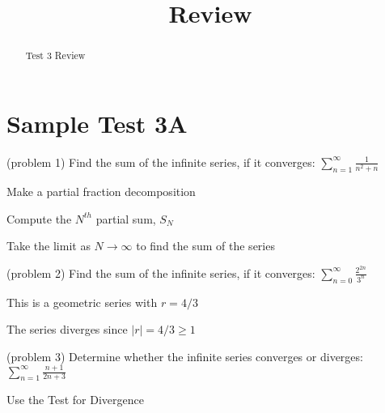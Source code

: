 \documentclass[handout]{ximera}
\title{Review}
\begin{document}
\begin{abstract}
Test 3 Review
\end{abstract}

\maketitle

\section{Sample Test 3A}





\begin{problem}(problem 1)
Find the sum of the infinite series, if it converges: $\displaystyle\sum_{n=1}^\infty \frac{1}{n^2 +n}$

\begin{hint}
Make a partial fraction decomposition
\end{hint}

\begin{hint}
Compute the $N^{th}$ partial sum, $S_N$
\end{hint}

\begin{hint}
Take the limit as $N \to \infty$ to find the sum of the series
\end{hint}

\end{problem}


\begin{problem}(problem 2)
Find the sum of the infinite series, if it converges: $\displaystyle \sum_{n=0}^\infty \frac{2^{2n}}{3^n}$
\begin{hint}
This is a geometric series with $r = 4/3$
\end{hint}

\begin{hint}
The series diverges since $|r| = 4/3 \geq 1$
\end{hint}

\end{problem}



\begin{problem}(problem 3)
Determine whether the infinite series converges or diverges: $\displaystyle \sum_{n=1}^\infty \frac{n+1}{2n+3}$

\begin{hint}
Use the Test for Divergence
\end{hint}

\end{problem}
\end{document}
